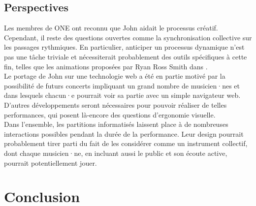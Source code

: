\subsection{Perspectives}

\noindent Les membres de ONE ont reconnu que John aidait le processus créatif. Cependant, il reste des questions ouvertes comme la synchronisation collective sur les passages rythmiques. En particulier, anticiper un processus dynamique n'est pas une tâche triviale et nécessiterait probablement des outils spécifiques à cette fin, telles que les animations proposées par Ryan Ross Smith dans \cite{smith_atomic_2015}.\\
\indent Le portage de John sur une technologie web a été en partie motivé par la possibilité de futurs concerts impliquant un grand nombre de musicien·nes et dans lesquels chacun·e pourrait voir sa partie avec un simple navigateur web. D'autres développements seront nécessaires pour pouvoir réaliser de telles performances, qui posent là-encore des questions d'ergonomie visuelle.\\
\indent Dans l'ensemble, les partitions informatisés laissent place à de nombreuses interactions possibles pendant la durée de la performance. Leur design pourrait probablement tirer parti du fait de les considérer comme un instrument collectif, dont chaque musicien·ne, en incluant aussi le public et son écoute active, pourrait potentiellement jouer.


\section{Conclusion}

